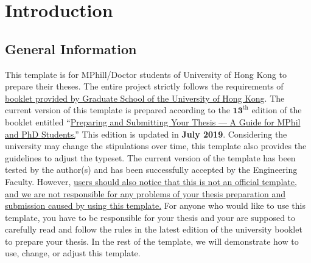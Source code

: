 
\chapter{Introduction} %

\label{Chapter1} %




\section{General Information}
\label{chap1:sec1:general_information}
This template is for MPhill/Doctor students of University of Hong Kong to prepare their theses. The entire project strictly follows the requirements of \uline{booklet provided by Graduate School of the University of Hong Kong}. The current version of this template is prepared according to the $\boldsymbol{13^\mathrm{th}}$ edition of the booklet entitled ``\href{https://intraweb.hku.hk/reserved_1/gradsch/PreparingandSubmittingYourThesis.pdf}{Preparing and Submitting Your Thesis --- A Guide for MPhil and PhD Students.}'' This edition is updated in \textbf{July 2019}. Considering the university may change the stipulations over time, this template also provides the guidelines to adjust the typeset. The current version of the template has been tested by the author(s) \cite{Abadi2016Tensorflow} and has been successfully accepted by the Engineering Faculty.
However, \uline{users should also notice that this is not an official template, and we are not responsible for any problems of your thesis preparation and submission caused by using this template.} For anyone who would like to use this template, you have to be responsible for your thesis and your are supposed to carefully read and follow the rules in the latest edition of the university booklet to prepare your thesis. In the rest of the template, we will demonstrate how to use, change, or adjust this template.


